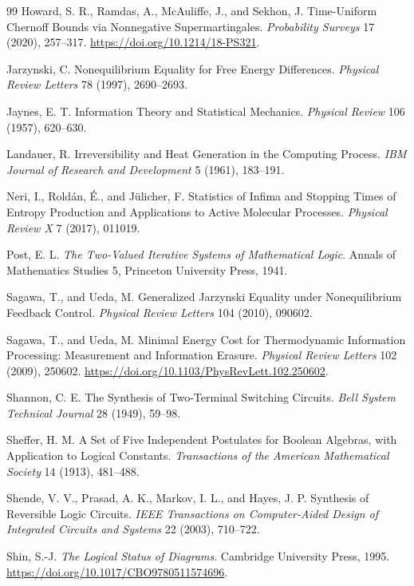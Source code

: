 \documentclass[11pt]{article}
\theoremstyle{definition}
\theoremstyle{remark}
\begin{document}
\begin{thebibliography}{99}
Howard, S. R., Ramdas, A., McAuliffe, J., and Sekhon, J. Time-Uniform Chernoff Bounds via Nonnegative Supermartingales. \emph{Probability Surveys} 17 (2020), 257--317. \url{https://doi.org/10.1214/18-PS321}.

Jarzynski, C. Nonequilibrium Equality for Free Energy Differences. \emph{Physical Review Letters} 78 (1997), 2690--2693.

Jaynes, E. T. Information Theory and Statistical Mechanics. \emph{Physical Review} 106 (1957), 620--630.

Landauer, R. Irreversibility and Heat Generation in the Computing Process. \emph{IBM Journal of Research and Development} 5 (1961), 183--191.

Neri, I., Rold\'an, \'E., and J\"ulicher, F. Statistics of Infima and Stopping Times of Entropy Production and Applications to Active Molecular Processes. \emph{Physical Review X} 7 (2017), 011019.

Post, E. L. \emph{The Two-Valued Iterative Systems of Mathematical Logic}. Annals of Mathematics Studies 5, Princeton University Press, 1941.

Sagawa, T., and Ueda, M. Generalized Jarzynski Equality under Nonequilibrium Feedback Control. \emph{Physical Review Letters} 104 (2010), 090602.

Sagawa, T., and Ueda, M. Minimal Energy Cost for Thermodynamic Information Processing: Measurement and Information Erasure. \emph{Physical Review Letters} 102 (2009), 250602. \url{https://doi.org/10.1103/PhysRevLett.102.250602}.

Shannon, C. E. The Synthesis of Two-Terminal Switching Circuits. \emph{Bell System Technical Journal} 28 (1949), 59--98.

Sheffer, H. M. A Set of Five Independent Postulates for Boolean Algebras, with Application to Logical Constants. \emph{Transactions of the American Mathematical Society} 14 (1913), 481--488.

Shende, V. V., Prasad, A. K., Markov, I. L., and Hayes, J. P. Synthesis of Reversible Logic Circuits. \emph{IEEE Transactions on Computer-Aided Design of Integrated Circuits and Systems} 22 (2003), 710--722.

Shin, S.-J. \emph{The Logical Status of Diagrams}. Cambridge University Press, 1995. \url{https://doi.org/10.1017/CBO9780511574696}.


\end{thebibliography}
\end{document}
